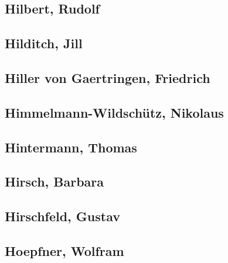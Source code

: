 \subsection[Hilbert, Rudolf (1)]{Hilbert, Rudolf}

\subsection[Hilditch, Jill (1)]{Hilditch, Jill}

\subsection[Hiller von Gaertringen, Friedrich (1)]{Hiller von Gaertringen, Friedrich}

\subsection[Himmelmann-Wildschütz, Nikolaus (1)]{Himmelmann-Wildschütz, Nikolaus}

\subsection[Hintermann, Thomas (1)]{Hintermann, Thomas}

\subsection[Hirsch, Barbara (1)]{Hirsch, Barbara}

\subsection[Hirschfeld, Gustav (2)]{Hirschfeld, Gustav}


\subsection[Hoepfner, Wolfram (4)]{Hoepfner, Wolfram}


